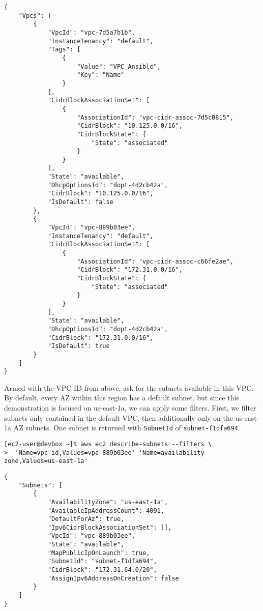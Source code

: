 \begin{verbatim}
{
    "Vpcs": [
        {
            "VpcId": "vpc-7d5a7b1b", 
            "InstanceTenancy": "default", 
            "Tags": [
                {
                    "Value": "VPC_Ansible", 
                    "Key": "Name"
                }
            ], 
            "CidrBlockAssociationSet": [
                {
                    "AssociationId": "vpc-cidr-assoc-7d5c0815", 
                    "CidrBlock": "10.125.0.0/16", 
                    "CidrBlockState": {
                        "State": "associated"
                    }
                }
            ], 
            "State": "available", 
            "DhcpOptionsId": "dopt-4d2cb42a", 
            "CidrBlock": "10.125.0.0/16", 
            "IsDefault": false
        }, 
        {
            "VpcId": "vpc-889b03ee", 
            "InstanceTenancy": "default", 
            "CidrBlockAssociationSet": [
                {
                    "AssociationId": "vpc-cidr-assoc-c66fe2ae", 
                    "CidrBlock": "172.31.0.0/16", 
                    "CidrBlockState": {
                        "State": "associated"
                    }
                }
            ], 
            "State": "available", 
            "DhcpOptionsId": "dopt-4d2cb42a", 
            "CidrBlock": "172.31.0.0/16", 
            "IsDefault": true
        }
    ]
}
\end{verbatim}

Armed with the VPC ID from above, ask for the subnets available in this VPC\@.
By default, every AZ within this region has a default subnet, but since this
demonstration is focused on us-east-1a, we can apply some filters. First, we
filter subnets only contained in the default VPC, then additionally only on
the us-east-1a AZ subnets. One subnet is returned with \verb|SubnetId|
of \verb|subnet-f1dfa694|.

\begin{verbatim}
[ec2-user@devbox ~]$ aws ec2 describe-subnets --filters \
>  'Name=vpc-id,Values=vpc-889b03ee' 'Name=availability-zone,Values=us-east-1a'
\end{verbatim}

\begin{verbatim}
{
    "Subnets": [
        {
            "AvailabilityZone": "us-east-1a", 
            "AvailableIpAddressCount": 4091, 
            "DefaultForAz": true, 
            "Ipv6CidrBlockAssociationSet": [], 
            "VpcId": "vpc-889b03ee", 
            "State": "available", 
            "MapPublicIpOnLaunch": true, 
            "SubnetId": "subnet-f1dfa694", 
            "CidrBlock": "172.31.64.0/20", 
            "AssignIpv6AddressOnCreation": false
        }
    ]
}
\end{verbatim}

